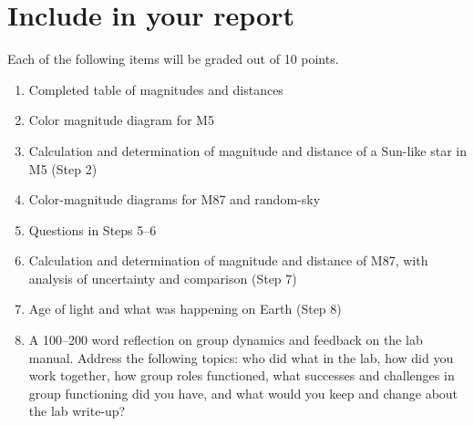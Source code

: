 \section{Include in your report}

Each of the following items will be graded out of 10 points.

\begin{enumerate}
	\item Completed table of magnitudes and distances
	
	\item Color magnitude diagram for M5
	
	\item Calculation and determination of magnitude and distance of a Sun-like star in M5 (Step 2)

	\item Color-magnitude diagrams for M87 and random-sky
	
	\item Questions in Steps 5--6
	
	\item Calculation and determination of magnitude and distance of M87, with analysis of uncertainty and comparison (Step 7)
	
	\item Age of light and what was happening on Earth (Step 8)
	
	\item A 100--200 word reflection on group dynamics and feedback on the lab manual. Address the following topics: who did what in the lab, how did you work together, how group roles functioned, what successes and challenges in group functioning did you have, and what would you keep and change about the lab write-up?
		
\end{enumerate}